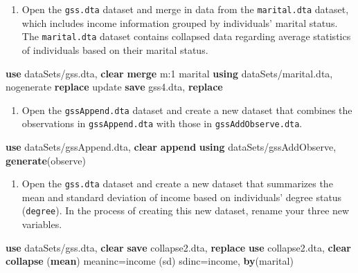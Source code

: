 \documentclass[
]{book}
\newenvironment{Shaded}{\begin{snugshade}}{\end{snugshade}}
\newcommand{\FunctionTok}[1]{\textcolor[rgb]{0.00,0.00,0.00}{#1}}
\newcommand{\KeywordTok}[1]{\textcolor[rgb]{0.13,0.29,0.53}{\textbf{#1}}}
\newcommand{\NormalTok}[1]{#1}
\providecommand{\tightlist}{%
  \setlength{\itemsep}{0pt}\setlength{\parskip}{0pt}}
\begin{document}
\begin{enumerate}
\def\labelenumi{\arabic{enumi}.}
\setcounter{enumi}{1}
\tightlist
\item
  Open the \texttt{gss.dta} dataset and merge in data from the \texttt{marital.dta} dataset, which includes income information grouped by individuals' marital status. The \texttt{marital.dta} dataset contains collapsed data regarding average statistics of individuals based on their marital status.
\end{enumerate}

\begin{Shaded}
\begin{Highlighting}[]
\KeywordTok{use}\NormalTok{ dataSets/gss.dta, }\KeywordTok{clear}
\KeywordTok{merge} \FunctionTok{m}\NormalTok{:1 marital }\KeywordTok{using}\NormalTok{ dataSets/marital.dta, nogenerate }\KeywordTok{replace}\NormalTok{ update}
\KeywordTok{save}\NormalTok{ gss4.dta, }\KeywordTok{replace}
\end{Highlighting}
\end{Shaded}

\begin{enumerate}
\def\labelenumi{\arabic{enumi}.}
\setcounter{enumi}{2}
\tightlist
\item
  Open the \texttt{gssAppend.dta} dataset and create a new dataset that combines the observations in \texttt{gssAppend.dta} with those in \texttt{gssAddObserve.dta}.
\end{enumerate}

\begin{Shaded}
\begin{Highlighting}[]
\KeywordTok{use}\NormalTok{ dataSets/gssAppend.dta, }\KeywordTok{clear}
\KeywordTok{append} \KeywordTok{using}\NormalTok{ dataSets/gssAddObserve, }\KeywordTok{generate}\NormalTok{(observe) }
\end{Highlighting}
\end{Shaded}

\begin{enumerate}
\def\labelenumi{\arabic{enumi}.}
\setcounter{enumi}{3}
\tightlist
\item
  Open the \texttt{gss.dta} dataset and create a new dataset that summarizes the mean and standard deviation of income based on individuals' degree status (\texttt{degree}). In the process of creating this new dataset, rename your three new variables.
\end{enumerate}

\begin{Shaded}
\begin{Highlighting}[]
\KeywordTok{use}\NormalTok{ dataSets/gss.dta, }\KeywordTok{clear}
\KeywordTok{save}\NormalTok{ collapse2.dta, }\KeywordTok{replace}
\KeywordTok{use}\NormalTok{ collapse2.dta, }\KeywordTok{clear}
\KeywordTok{collapse}\NormalTok{ (}\KeywordTok{mean}\NormalTok{) meaninc=income (}\FunctionTok{sd}\NormalTok{) sdinc=income, }\KeywordTok{by}\NormalTok{(marital)}
\end{Highlighting}
\end{Shaded}
\end{document}
